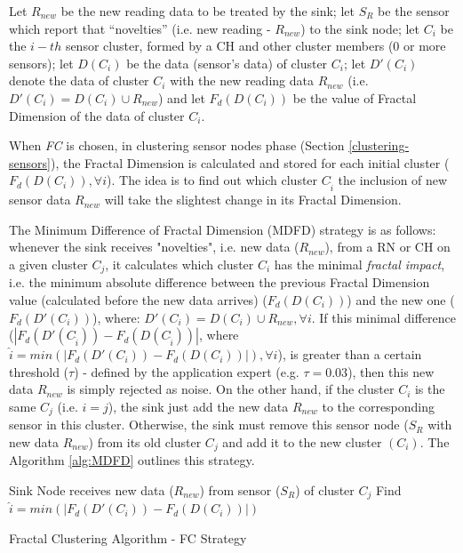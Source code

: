 \documentclass[conference]{IEEEtran}
\begin{document}
Let $R_{new}$ be the new reading data to be treated by the sink; let $S_{R}$ be
the sensor which report that ``novelties'' (i.e. new reading - $R_{new}$) to the
sink node; let $C_i$ be the $i-th$ sensor cluster, formed by a 
CH and other cluster members (0 or more sensors); let $D(C_i)$
be the data (sensor's data) of cluster $C_i$; let $D'(C_i)$ denote the data of
cluster $C_i$ with the new reading data $R_{new}$ (i.e. $D'(C_i) = D(C_i) \cup
R_{new}$) and let $F_{d}(D(C_i))$ be the value of Fractal Dimension of the data
of cluster $C_i$.

When \textit{FC} is chosen, in clustering sensor nodes phase (Section
\ref{clustering-sensors}), the Fractal Dimension is calculated and stored for
each initial cluster ($F_{d}(D(C_i)), \forall i$). The idea is to find out which
cluster $C_{\hat{i}}$ the inclusion of new sensor data $R_{new}$ will take the
slightest change in its Fractal Dimension.

The Minimum Difference of Fractal Dimension (MDFD) strategy is as follows:
whenever the sink receives "novelties", i.e. new data ($R_{new}$), from a RN or CH on
a given cluster $C_j$, it calculates which cluster $C_i$ has the minimal
\textit{fractal impact}, i.e. the minimum absolute difference between the
previous Fractal Dimension value (calculated before the new data arrives)
($F_d(D(C_i))$) and the new one ($F_d(D'(C_i))$), where: $D'(C_i) = D(C_i) \cup
R_{new}, \forall i$.
If this minimal difference ($|F_d(D'(C_{\hat{i}})) - F_d(D(C_{\hat{i}}))|$,
where $\hat{i} = min(|F_d(D'(C_i)) - F_d(D(C_i))|), \forall i$), is greater than
a certain threshold ($\tau$) - defined by the application expert (e.g. $\tau =
0.03$), then this new data $R_{new}$ is simply rejected as noise.
On the other hand, if the cluster $C_i$ is the same $C_j$ (i.e. $i=j$), the
sink just add the new data $R_{new}$ to the corresponding sensor in this cluster.
Otherwise, the sink must remove this sensor node ($S_{R}$ with new data
$R_{new}$) from its old cluster $C_j$ and add it to the new cluster $(C_i)$.
The Algorithm \ref{alg:MDFD} outlines this strategy.

\begin{algorithm}
 \SetAlgoLined
 \LinesNumbered
 Sink Node receives new data ($R_{new}$) from sensor ($S_{R}$) of cluster $C_j$\;
  Find $\hat{i} = min(|F_d(D'(C_i)) - F_d(D(C_i))|)$\;
 
 \caption{Fractal Clustering Algorithm - FC Strategy}
 \label{alg:MDFD}
\end{algorithm}
\end{document}
